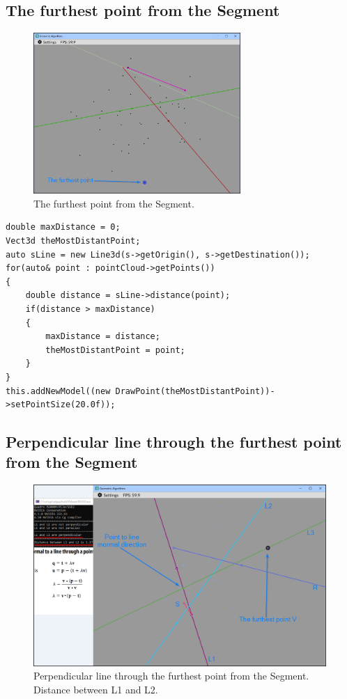 \documentclass[12pt,a4paper,english]{article}
\begin{document}
\subsection{The furthest point from the Segment}

\begin{figure}[H]
    \centering
    \includegraphics[width=0.7\textwidth]{p2a-3}
    \caption[]{The furthest point from the Segment.}
    \label{fig:p2a-3}
\end{figure}

\begin{verbatim}
double maxDistance = 0;
Vect3d theMostDistantPoint;
auto sLine = new Line3d(s->getOrigin(), s->getDestination());
for(auto& point : pointCloud->getPoints())
{
    double distance = sLine->distance(point);
    if(distance > maxDistance)
    {
        maxDistance = distance;
        theMostDistantPoint = point;
    }
}
this.addNewModel((new DrawPoint(theMostDistantPoint))->setPointSize(20.0f));
\end{verbatim}

\subsection{Perpendicular line through the furthest point from the Segment}

\begin{figure}[H]
    \centering
    \includegraphics[width=0.99\textwidth]{p2a-4}
    \caption[]{Perpendicular line through the furthest point from the Segment.\\ Distance between L1 and L2.}
    \label{fig:p2a-4}
\end{figure}
\end{document}
